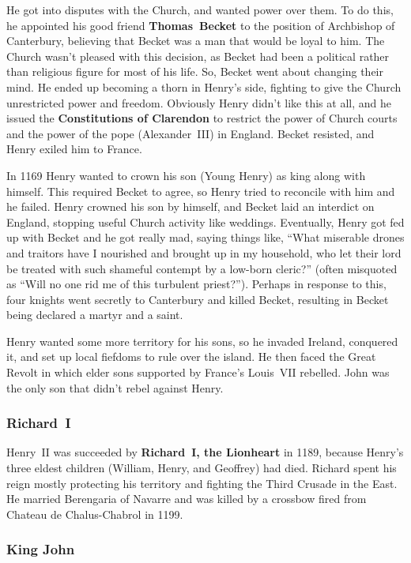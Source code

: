 He got into disputes with the Church, and wanted power over them.
To do this, he appointed his good friend \textbf{Thomas~Becket} to the position of Archbishop of Canterbury,
believing that Becket was a man that would be loyal to him.
The Church wasn't pleased with this decision,
as Becket had been a political rather than religious figure for most of his life.
So, Becket went about changing their mind.
He ended up becoming a thorn in Henry's side,
fighting to give the Church unrestricted power and freedom.
Obviously Henry didn't like this at all,
and he issued the \textbf{Constitutions of Clarendon} to restrict the power of Church courts
and the power of the pope (Alexander~III) in England.
Becket resisted, and Henry exiled him to France.

In 1169 Henry wanted to crown his son (Young Henry) as king along with himself.
This required Becket to agree, so Henry tried to reconcile with him and he failed.
Henry crowned his son by himself, and Becket laid an interdict on England,
stopping useful Church activity like weddings.
Eventually, Henry got fed up with Becket and he got really mad, saying things like,
``What miserable drones and traitors have I nourished and brought up in my household,
who let their lord be treated with such shameful contempt by a low-born cleric?''
(often misquoted as ``Will no one rid me of this turbulent priest?'').
Perhaps in response to this, four knights went secretly to Canterbury and killed Becket,
resulting in Becket being declared a martyr and a saint.

Henry wanted some more territory for his sons, so he invaded Ireland, conquered it,
and set up local fiefdoms to rule over the island.
He then faced the Great Revolt in which elder sons supported by France's Louis~VII rebelled.
John was the only son that didn't rebel against Henry.

\subsubsection*{Richard~I}

Henry~II was succeeded by \textbf{Richard~I, the Lionheart} in 1189,
because Henry's three eldest children (William, Henry, and Geoffrey) had died.
Richard spent his reign mostly protecting his territory and fighting the Third Crusade in the East.
He married Berengaria of Navarre and was killed by a crossbow fired from Chateau de Chalus-Chabrol in 1199.

\subsubsection*{King John}

